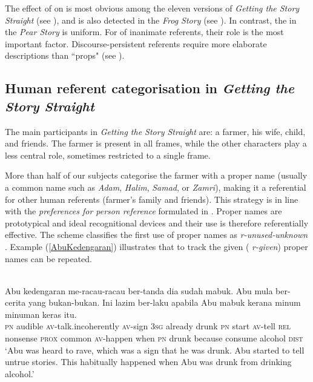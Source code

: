 \documentclass[output=paper
,modfonts
,nonflat]{langsci/langscibook}
\begin{document}
The effect of   on  is most obvious among the eleven versions of \emph{Getting the Story Straight} (see ), and is also detected in the \emph{Frog Story} (see ). In contrast, the   in the \emph{Pear Story} is uniform. For  of inanimate referents, their  role is the most important factor. Discourse-persistent referents require more elaborate descriptions than ``props" (see ).


\subsection{Human referent categorisation in \emph{Getting the Story Straight}}\label{CategorisationHumanGSS}
The main participants in \emph{Getting the Story Straight} are: a farmer, his wife, child, and friends. The farmer is present in all frames, while the other characters play a less central role, sometimes restricted to a single frame.

More than half of our subjects categorise the farmer with a proper name (usually a common  name such as \emph{Adam}, \emph{Halim}, \emph{Samad}, or \emph{Zamri}), making it a referential  for other human referents (farmer's family and friends). This strategy is in line with the \emph{preferences for person reference} formulated in \cite[24]{SacksSchegloff2007}. Proper names are prototypical and ideal recognitional devices \citep[25]{SacksSchegloff2007} and their use is therefore referentially effective. The  scheme classifies the first use of proper names as \emph{r-unused-unknown} \citep[10]{RiesterBaumann2017}. Example (\ref{AbuKedengaran}) illustrates that to track the given  ( \emph{r-given}) proper names can be repeated.

\ea\label{AbuKedengaran} 
\\
\gll {\ob}Abu{\cb}         kedengaran me-racau-racau     ber-tanda   dia sudah   mabuk.  {\ob}Abu{\cb}         mula  ber-cerita yang bukan-bukan. Ini  lazim  ber-laku apabila  {\ob}Abu{\cb}         mabuk kerana  minum {minuman keras} itu.\\
\textsc{pn} audible       \textsc{av-}talk.incoherently \textsc{av-}sign  \textsc{3sg} already drunk \textsc{pn} start \textsc{av-}tell      \textsc{rel}  nonsense \textsc{prox} common \textsc{av-}happen  when   \textsc{pn}  drunk because consume alcohol     \textsc{dist}\\
\glt `Abu was heard to rave, which was a sign that he was drunk. Abu started to tell untrue stories. This habitually happened when Abu was drunk from drinking alcohol.'
\z
\end{document}
